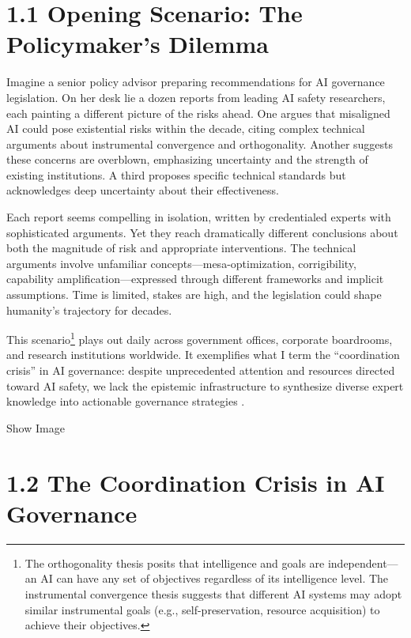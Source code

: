 \documentclass[
  11pt,
  letterpaper,
]{book}
\begin{document}
\section{1.1 Opening Scenario: The Policymaker's
Dilemma}\label{opening-scenario-the-policymakers-dilemma}

Imagine a senior policy advisor preparing recommendations for AI
governance legislation. On her desk lie a dozen reports from leading AI
safety researchers, each painting a different picture of the risks
ahead. One argues that misaligned AI could pose existential risks within
the decade, citing complex technical arguments about instrumental
convergence and orthogonality. Another suggests these concerns are
overblown, emphasizing uncertainty and the strength of existing
institutions. A third proposes specific technical standards but
acknowledges deep uncertainty about their effectiveness.

Each report seems compelling in isolation, written by credentialed
experts with sophisticated arguments. Yet they reach dramatically
different conclusions about both the magnitude of risk and appropriate
interventions. The technical arguments involve unfamiliar
concepts---mesa-optimization, corrigibility, capability
amplification---expressed through different frameworks and implicit
assumptions. Time is limited, stakes are high, and the legislation could
shape humanity's trajectory for decades.

This scenario\footnote{The orthogonality thesis posits that intelligence
  and goals are independent---an AI can have any set of objectives
  regardless of its intelligence level. The instrumental convergence
  thesis suggests that different AI systems may adopt similar
  instrumental goals (e.g., self-preservation, resource acquisition) to
  achieve their objectives.} plays out daily across government offices,
corporate boardrooms, and research institutions worldwide. It
exemplifies what I term the ``coordination crisis'' in AI governance:
despite unprecedented attention and resources directed toward AI safety,
we lack the epistemic infrastructure to synthesize diverse expert
knowledge into actionable governance strategies \textcite{todd2024}.

Show Image

\section{1.2 The Coordination Crisis in AI
Governance}\label{the-coordination-crisis-in-ai-governance}
\end{document}
